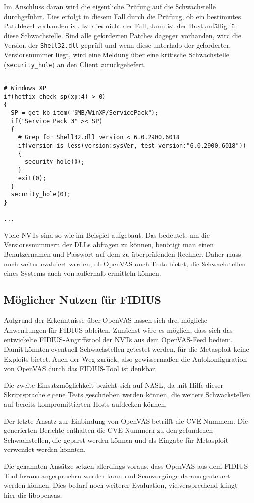 Im Anschluss daran wird die eigentliche Prüfung auf die Schwachstelle durchgeführt. 
Dies erfolgt in diesem Fall durch die Prüfung, ob ein bestimmtes Patchlevel vorhanden 
ist. Ist dies nicht der Fall, dann ist der Host anfällig für diese Schwachstelle. Sind 
alle geforderten Patches dagegen vorhanden, wird die Version der \verb|Shell32.dll| geprüft 
und wenn diese unterhalb der geforderten Versionsnummer liegt, wird eine Meldung über eine 
kritische Schwachstelle (\verb|security_hole|) an den Client zurückgeliefert. 

\begin{verbatim}

# Windows XP
if(hotfix_check_sp(xp:4) > 0)
{
  SP = get_kb_item("SMB/WinXP/ServicePack");
  if("Service Pack 3" >< SP)
  {
    # Grep for Shell32.dll version < 6.0.2900.6018
    if(version_is_less(version:sysVer, test_version:"6.0.2900.6018"))
    {
      security_hole(0);
    }
    exit(0);
  }
  security_hole(0);
}

...

\end{verbatim}

Viele NVTs sind so wie im Beispiel aufgebaut. Das bedeutet, um die Versionssnummern der 
DLLs abfragen zu können, benötigt man einen Benutzernamen und Passwort auf dem zu 
überprüfenden Rechner. Daher muss noch weiter evaluiert werden, ob OpenVAS auch Tests bietet, 
die Schwachstellen eines Systems auch von außerhalb ermitteln können.


\subsection{Möglicher Nutzen für FIDIUS}

Aufgrund der Erkenntnisse über OpenVAS lassen sich drei mögliche Anwendungen für 
FIDIUS ableiten. Zunächst wäre es möglich, dass sich das entwickelte FIDIUS-Angriffstool 
der NVTs aus dem OpenVAS-Feed bedient. Damit könnten eventuell Schwachstellen getestet 
werden, für die Metasploit keine Exploits bietet. Auch der Weg zurück, also 
gewissermaßen die Autokonfiguration von OpenVAS durch das FIDIUS-Tool ist denkbar.

Die zweite Einsatzmöglichkeit bezieht sich auf NASL, da mit Hilfe dieser Skriptsprache 
eigene Tests geschrieben werden können, die weitere Schwachstellen auf bereits 
kompromittierten Hosts aufdecken können.

Der letzte Ansatz zur Einbindung von OpenVAS betrifft die CVE-Nummern. Die generierten 
Berichte enthalten die CVE-Nummern zu den gefundenen Schwachstellen, die geparst werden 
können und als Eingabe für Metasploit verwendet werden könnten.

Die genannten Ansätze setzen allerdings voraus, dass OpenVAS aus dem FIDIUS-Tool heraus 
angesprochen werden kann und Scanvorgänge daraus gesteuert werden können. Dies bedarf 
noch weiterer Evaluation, vielversprechend klingt hier die libopenvas.
